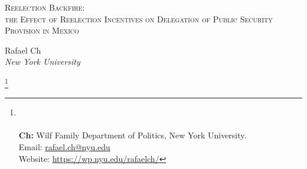 \documentclass[12pt]{amsart}
\title{}
\numberwithin{equation}{section}
\theoremstyle{definition}
\theoremstyle{definition}
\theoremstyle{definition}
\begin{document}
	\vspace*{3ex minus 1ex}
	\begin{center}
		\Large \textsc{Reelection Backfire: \\ the Effect of Reelection Incentives on Delegation of Public Security Provision in Mexico}%
	\end{center}
	
	
\date{April 23, 2021} 
\vspace*{3ex minus 1ex}
	\begin{center}
		Rafael Ch\\
		
		\textit{New York University}\\
		
	\end{center}
	 
	\thanks{%
	\\
	 \\ \textbf{Ch:} Wilf Family Department of Politics, New York University. \\ Email: \url{rafael.ch@nyu.edu}
	 \\ Website: \url{https://wp.nyu.edu/rafaelch/}}
		  
\end{document}
